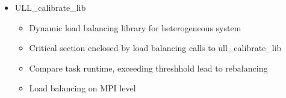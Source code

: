 \begin{itemize}
\item ULL\_calibrate\_lib \cite{ref:ull_calibrate_lib}
  \begin{itemize}
  \item Dynamic load balancing library for heterogeneous system
  \item Critical section enclosed by load balancing calls to ull\_calibrate\_lib
  \item Compare task runtime, exceeding threshhold lead to rebalancing
  \item Load balancing on MPI level 
  \end{itemize}

\end{itemize}


\cleardoublepage

